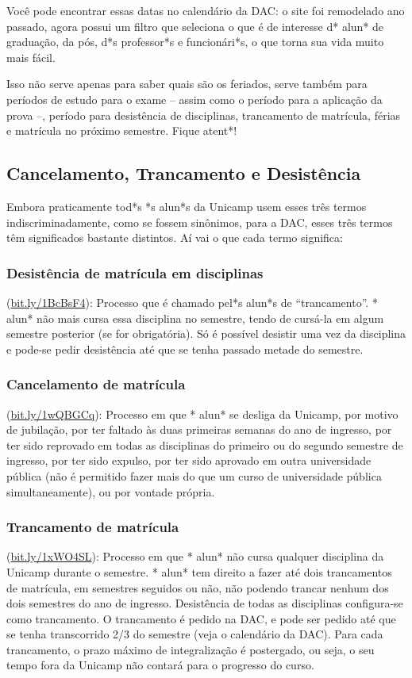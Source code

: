 Você pode encontrar essas datas no calendário da DAC: o site foi remodelado ano
passado, agora possui um filtro que seleciona o que é de interesse d* alun* de
graduação, da pós, d*s professor*s e funcionári*s, o que torna sua vida muito
mais fácil.

Isso não serve apenas para saber quais são os feriados, serve também para
períodos de estudo para o exame -- assim como o período para a aplicação da
prova --, período para desistência de disciplinas, trancamento de matrícula,
férias e matrícula no próximo semestre. Fique atent*!

\subsection{Cancelamento, Trancamento e Desistência}

Embora praticamente tod*s *s alun*s da Unicamp usem esses três termos
indiscriminadamente, como se fossem sinônimos, para a DAC, esses três termos
têm significados bastante distintos. Aí vai o que cada termo significa:

\subsubsection{Desistência de matrícula em disciplinas} (\url{bit.ly/1BcBsF4}):
Processo que é chamado pel*s alun*s de ``trancamento''. * alun* não mais cursa
essa disciplina no semestre, tendo de cursá-la em algum semestre posterior (se
for obrigatória). Só é possível desistir uma vez da disciplina e pode-se pedir
desistência até que se tenha passado metade do semestre.
\subsubsection{Cancelamento de matrícula} (\url{bit.ly/1wQBGCq}): Processo em
que * alun* se desliga da Unicamp, por motivo de jubilação, por ter faltado às
duas primeiras semanas do ano de ingresso, por ter sido reprovado em todas as
disciplinas do primeiro ou do segundo semestre de ingresso, por ter sido
expulso, por ter sido aprovado em outra universidade pública (não é permitido
fazer mais do que um curso de universidade pública simultaneamente), ou por
vontade própria.
\subsubsection{Trancamento de matrícula} (\url{bit.ly/1xWO4SL}): Processo em
que * alun* não cursa qualquer disciplina da Unicamp durante o semestre. *
alun* tem direito a fazer até dois trancamentos de matrícula, em semestres
seguidos ou não, não podendo trancar nenhum dos dois semestres do ano de
ingresso. Desistência de todas as disciplinas configura-se como trancamento. O
trancamento é pedido na DAC, e pode ser pedido até que se tenha transcorrido
2/3 do semestre (veja o calendário da DAC). Para cada trancamento, o prazo
máximo de integralização é postergado, ou seja, o seu tempo fora da Unicamp não
contará para o progresso do curso.

